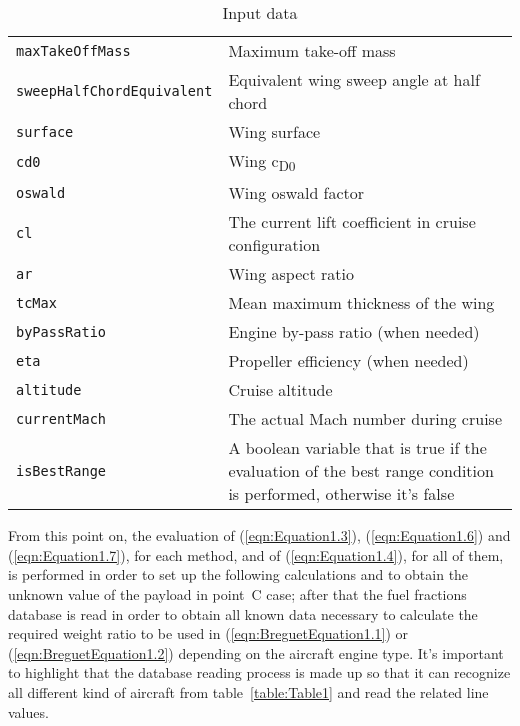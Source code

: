 \begin{table}[!ht]
\begin{tabular}{p{7cm}p{7.5cm}}
\toprule
\lstinline[language=Java]!maxTakeOffMass! & Maximum take-off mass \\[0.1	cm]
\lstinline[language=Java]!sweepHalfChordEquivalent! & Equivalent wing sweep angle at half chord \\[0.1cm]
\lstinline[language=Java]!surface! & Wing surface \\[0.1cm]
\lstinline[language=Java]!cd0!	& Wing c\textsubscript{D0} \\[0.1cm]
\lstinline[language=Java]!oswald!	& Wing oswald factor \\[0.1cm]
\lstinline[language=Java]!cl!	& The current lift coefficient in cruise configuration \\[0.1cm]
\lstinline[language=Java]!ar!	& Wing aspect ratio \\[0.1cm]
\lstinline[language=Java]!tcMax! & Mean maximum thickness of the wing \\[0.1cm]
\lstinline[language=Java]!byPassRatio! & Engine by-pass ratio (when needed) \\[0.1cm]
\lstinline[language=Java]!eta! & Propeller efficiency (when needed) \\[0.1cm]
\lstinline[language=Java]!altitude! & Cruise altitude \\[0.1cm]
\lstinline[language=Java]!currentMach! & The actual Mach number during cruise \\[0.1cm]
\lstinline[language=Java]!isBestRange! & A boolean variable that is true if the evaluation of the best range condition is performed, otherwise it's false         \\
\bottomrule
\end{tabular}
\caption{Input data}
\label{table:Table2}
\end{table}

From this point on, the evaluation of (\ref{eqn:Equation1.3}), (\ref{eqn:Equation1.6}) and (\ref{eqn:Equation1.7}), for each method, and of (\ref{eqn:Equation1.4}), for all of them, is performed in order to set up the following calculations and to obtain the unknown value of the payload in point~C case; after that the fuel fractions database is read in order to obtain all known data necessary to calculate the required weight ratio to be used in (\ref{eqn:BreguetEquation1.1}) or (\ref{eqn:BreguetEquation1.2}) depending on the aircraft engine type. It’s important to highlight that the database reading process is made up so that it can recognize all different kind of aircraft from table~\ref{table:Table1} and read the related line values.

